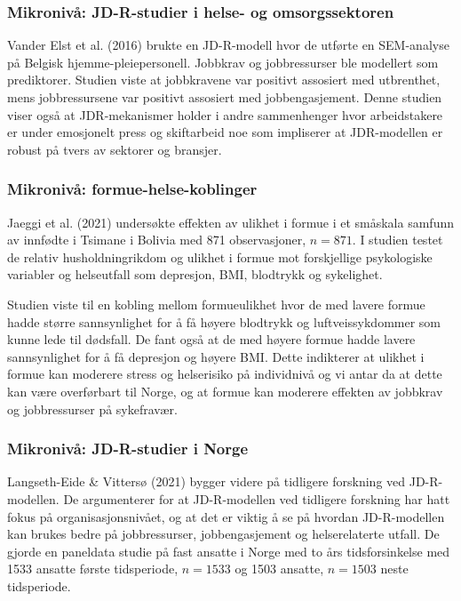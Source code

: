 \documentclass[
  12pt,
  a4paper,
  DIV=11,
  numbers=noendperiod]{scrartcl}
\begin{document}
\subsubsection{Mikronivå: JD-R-studier i helse- og
omsorgssektoren}\label{mikronivuxe5-jd-r-studier-i-helse--og-omsorgssektoren}

Vander Elst et al. (2016) brukte en JD-R-modell hvor de utførte en
SEM-analyse på Belgisk hjemme-pleiepersonell. Jobbkrav og jobbressurser
ble modellert som prediktorer. Studien viste at jobbkravene var positivt
assosiert med utbrenthet, mens jobbressursene var positivt assosiert med
jobbengasjement. Denne studien viser også at JDR-mekanismer holder i
andre sammenhenger hvor arbeidstakere er under emosjonelt press og
skiftarbeid noe som impliserer at JDR-modellen er robust på tvers av
sektorer og bransjer.

\subsubsection{Mikronivå:
formue-helse-koblinger}\label{mikronivuxe5-formue-helse-koblinger}

Jaeggi et al. (2021) undersøkte effekten av ulikhet i formue i et
småskala samfunn av innfødte i Tsimane i Bolivia med 871 observasjoner,
\(n = 871\). I studien testet de relativ husholdningrikdom og ulikhet i
formue mot forskjellige psykologiske variabler og helseutfall som
depresjon, BMI, blodtrykk og sykelighet.

Studien viste til en kobling mellom formueulikhet hvor de med lavere
formue hadde større sannsynlighet for å få høyere blodtrykk og
luftveissykdommer som kunne lede til dødsfall. De fant også at de med
høyere formue hadde lavere sannsynlighet for å få depresjon og høyere
BMI. Dette indikterer at ulikhet i formue kan moderere stress og
helserisiko på individnivå og vi antar da at dette kan være overførbart
til Norge, og at formue kan moderere effekten av jobbkrav og
jobbressurser på sykefravær.

\subsubsection{Mikronivå: JD-R-studier i
Norge}\label{mikronivuxe5-jd-r-studier-i-norge}

Langseth-Eide \& Vittersø (2021) bygger videre på tidligere forskning
ved JD-R-modellen. De argumenterer for at JD-R-modellen ved tidligere
forskning har hatt fokus på organisasjonsnivået, og at det er viktig å
se på hvordan JD-R-modellen kan brukes bedre på jobbressurser,
jobbengasjement og helserelaterte utfall. De gjorde en paneldata studie
på fast ansatte i Norge med to års tidsforsinkelse med 1533 ansatte
første tidsperiode, \(n =1533\) og 1503 ansatte, \(n = 1503\) neste
tidsperiode.
\end{document}
